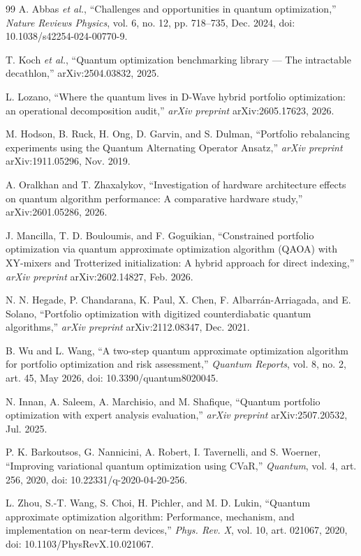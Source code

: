 \documentclass[journal]{IEEEtran}
\begin{document}
\begin{thebibliography}{99}
 A. Abbas \textit{et al.}, ``Challenges and opportunities in quantum optimization,'' \textit{Nature Reviews Physics}, vol. 6, no. 12, pp. 718--735, Dec. 2024, doi: 10.1038/s42254-024-00770-9.

 T. Koch \textit{et al.}, ``Quantum optimization benchmarking library --- The intractable decathlon,'' arXiv:2504.03832, 2025.

 L. Lozano, ``Where the quantum lives in D-Wave hybrid portfolio optimization: an operational decomposition audit,'' \textit{arXiv preprint} arXiv:2605.17623, 2026.

 M. Hodson, B. Ruck, H. Ong, D. Garvin, and S. Dulman, ``Portfolio rebalancing experiments using the Quantum Alternating Operator Ansatz,'' \textit{arXiv preprint} arXiv:1911.05296, Nov. 2019.

 A. Oralkhan and T. Zhaxalykov, ``Investigation of hardware architecture effects on quantum algorithm performance: A comparative hardware study,'' arXiv:2601.05286, 2026.

 J. Mancilla, T. D. Bouloumis, and F. Goguikian, ``Constrained portfolio optimization via quantum approximate optimization algorithm (QAOA) with XY-mixers and Trotterized initialization: A hybrid approach for direct indexing,'' \textit{arXiv preprint} arXiv:2602.14827, Feb. 2026.

 N. N. Hegade, P. Chandarana, K. Paul, X. Chen, F. Albarr\'{a}n-Arriagada, and E. Solano, ``Portfolio optimization with digitized counterdiabatic quantum algorithms,'' \textit{arXiv preprint} arXiv:2112.08347, Dec. 2021.

 B. Wu and L. Wang, ``A two-step quantum approximate optimization algorithm for portfolio optimization and risk assessment,'' \textit{Quantum Reports}, vol. 8, no. 2, art. 45, May 2026, doi: 10.3390/quantum8020045.

 N. Innan, A. Saleem, A. Marchisio, and M. Shafique, ``Quantum portfolio optimization with expert analysis evaluation,'' \textit{arXiv preprint} arXiv:2507.20532, Jul. 2025.

 P. K. Barkoutsos, G. Nannicini, A. Robert, I. Tavernelli, and S. Woerner, ``Improving variational quantum optimization using CVaR,'' \textit{Quantum}, vol. 4, art. 256, 2020, doi: 10.22331/q-2020-04-20-256.

 L. Zhou, S.-T. Wang, S. Choi, H. Pichler, and M. D. Lukin, ``Quantum approximate optimization algorithm: Performance, mechanism, and implementation on near-term devices,'' \textit{Phys. Rev. X}, vol. 10, art. 021067, 2020, doi: 10.1103/PhysRevX.10.021067.


\end{thebibliography}
\end{document}
